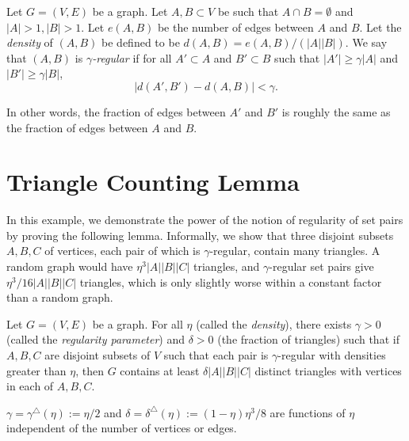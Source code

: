 \documentclass[10pt]{article}
\begin{document}
\begin{definition}
  Let $G = (V, E)$ be a graph. Let $A, B \subset V$ be such that $A \cap B = \emptyset$ and $|A| > 1, |B| > 1$. Let $e(A, B)$ be the number of edges between $A$ and $B$. Let the \emph{density} of $(A, B)$ be defined to be $d(A, B) = e(A, B)/(|A| |B|)$. We say that $(A, B)$ is \emph{$\gamma$-regular} if for all $A' \subset A$ and $B' \subset B$ such that  $|A'| \geq \gamma |A|$ and $|B'| \geq \gamma |B|$,
  $$ \left|d\left(A', B'\right) - d(A, B)\right| < \gamma. $$
\end{definition}

In other words, the fraction of edges between $A'$ and $B'$ is roughly the same as the fraction of edges between $A$ and $B$.

\section{Triangle Counting Lemma}

In this example, we demonstrate the power of the notion of regularity of set pairs by proving the following lemma. Informally, we show that three disjoint subsets $A, B, C$ of vertices, each pair of which is $\gamma$-regular, contain many triangles. A random graph would have $\eta^3 |A||B||C|$ triangles, and $\gamma$-regular set pairs give $\eta^3/16 |A| |B| |C|$ triangles, which is only slightly worse within a constant factor than a random graph.

\begin{lemma} \label{lem:triangle-counting}
  Let $G = (V, E)$ be a graph. For all $\eta$ (called the \emph{density}), there exists $\gamma > 0$ (called the \emph{regularity parameter}) and $\delta > 0$ (the fraction of triangles) such that if $A, B, C$ are disjoint subsets of $V$ such that each pair is $\gamma$-regular with densities greater than $\eta$, then $G$ contains at least $\delta |A| |B| |C|$ distinct triangles with vertices in each of $A, B, C$.
\end{lemma}

\begin{remark}
  $\gamma = \gamma^\triangle(\eta) := \eta/2$ and $\delta = \delta^\triangle(\eta) := (1 - \eta) \eta^3/8$ are functions of $\eta$ independent of the number of vertices or edges.
\end{remark}
\end{document}
